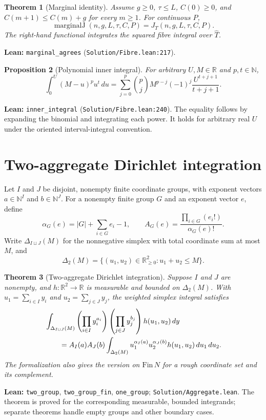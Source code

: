 \documentclass[11pt]{article}
\newtheorem{theorem}{Theorem}[section]
\newtheorem{proposition}[theorem]{Proposition}
\newcommand{\R}{\mathbb{R}}
\newcommand{\N}{\mathbb{N}}
\newcommand{\JT}{J_T}
\newcommand{\code}[1]{\texttt{#1}}
\begin{document}
\begin{theorem}[Marginal identity]\label{thm:marginal}
Assume $g\ge0$, $\tau\le L$, $C(0)\ge0$, and
$C(m+1)\le C(m)+g$ for every $m\ge1$. For continuous $P$,
\[
 \operatorname{marginalJ}(n,g,L,\tau,C,P)
 =\JT(n,g,L,\tau,C,P).
\]
The right-hand functional integrates the squared fibre integral over $\widehat T$.
\end{theorem}
\noindent\textbf{Lean:} \code{marginal\_agrees}
(\nolinkurl{Solution/Fibre.lean:217}).

\begin{proposition}[Polynomial inner integral]\label{prop:inner}
For arbitrary $U,M\in\R$ and $p,t\in\N$,
\[
 \int_0^U(M-u)^pu^t\,du
 =\sum_{j=0}^p\binom pj M^{p-j}(-1)^j
 \frac{U^{t+j+1}}{t+j+1}.
\]
\end{proposition}
\noindent\textbf{Lean:} \code{inner\_integral}
(\nolinkurl{Solution/Fibre.lean:240}). The equality follows by expanding the
binomial and integrating each power. It holds for arbitrary real $U$ under the
oriented interval-integral convention.

\section{Two-aggregate Dirichlet integration}\label{sec:aggregate}
Let $I$ and $J$ be disjoint, nonempty finite coordinate groups, with exponent
vectors $a\in\N^I$ and $b\in\N^J$. For a nonempty finite group $G$ and an
exponent vector $e$, define
\[
 \alpha_G(e)=|G|+\sum_{i\in G}e_i-1,\qquad
 A_G(e)=\frac{\prod_{i\in G}(e_i!)}{\alpha_G(e)!}.
\]
Write $\Delta_{I\sqcup J}(M)$ for the nonnegative simplex with total coordinate
sum at most $M$, and
\[
 \Delta_2(M)=\{(u_1,u_2)\in\R_{\ge0}^2:u_1+u_2\le M\}.
\]
\begin{theorem}[Two-aggregate Dirichlet integration]\label{thm:aggregate}
Suppose $I$ and $J$ are nonempty, and $h:\R^2\to\R$ is measurable and
bounded on $\Delta_2(M)$. With $u_1=\sum_{i\in I}y_i$ and
$u_2=\sum_{j\in J}y_j$, the weighted simplex integral satisfies
\begin{align}\label{eq:twoagg}
 &\int_{\Delta_{I\sqcup J}(M)}
   \left(\prod_{i\in I}y_i^{a_i}\right)
   \left(\prod_{j\in J}y_j^{b_j}\right)
   h(u_1,u_2)\,dy \notag\\
 &\qquad=A_I(a)A_J(b)
   \int_{\Delta_2(M)} u_1^{\alpha_I(a)}u_2^{\alpha_J(b)}
   h(u_1,u_2)\,du_1\,du_2.
\end{align}
The formalization also gives the version on $\mathrm{Fin}\,N$ for a rough
coordinate set and its complement.
\end{theorem}
\noindent\textbf{Lean:} \code{two\_group}, \code{two\_group\_fin},
\code{one\_group}; \nolinkurl{Solution/Aggregate.lean}. The theorem is proved
for the corresponding measurable, bounded integrands; separate theorems handle
empty groups and other boundary cases.
\end{document}
